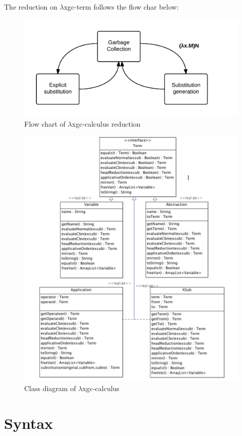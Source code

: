 The reduction on $\lambda$xgc-term follows the flow char below:

\begin{figure}[ht]
\centering
\includegraphics[scale=0.2]{pics/flow}
\caption{Flow chart of $\lambda$xgc-calculus reduction}
\label{fig:flow}
\end{figure}


\begin{figure}[ht]
\centering
\includegraphics[scale=0.8]{pics/Termxgc}
\caption{Class diagram of $\lambda$xgc-calculus}
\label{fig:termxgc}
\end{figure}
\section{Syntax}

